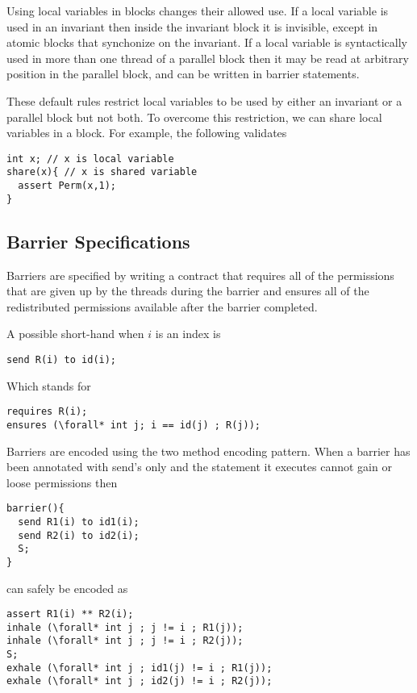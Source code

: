 Using local variables in blocks changes their allowed use.
If a local variable is used in an invariant then inside the invariant block it is invisible,
except in atomic blocks that synchonize on the invariant.
If a local variable is syntactically used in more than one thread of a
parallel block then it may be read at arbitrary position
in the parallel block, and can be written in barrier
statements.

These default rules restrict local variables to be used by either an invariant
or a parallel block but not both. To overcome this restriction, we can share local
variables in a block. For example, the following validates
\begin{lstlisting}
int x; // x is local variable
share(x){ // x is shared variable
  assert Perm(x,1);
}
\end{lstlisting}

\subsection{Barrier Specifications}

Barriers are specified by writing a contract that requires
all of the permissions that are given up by the threads
during the barrier and ensures all of the redistributed permissions
available after the barrier completed.

A possible short-hand when $i$ is an index is
\begin{lstlisting}
send R(i) to id(i);
\end{lstlisting}
Which stands for
\begin{lstlisting}
requires R(i);
ensures (\forall* int j; i == id(j) ; R(j));
\end{lstlisting}

Barriers are encoded using the two method encoding pattern.
When a barrier has been annotated with send's only
and the statement it executes cannot gain or loose permissions
then
\begin{lstlisting}
barrier(){
  send R1(i) to id1(i);
  send R2(i) to id2(i);
  S;
}
\end{lstlisting}
can safely be encoded as
\begin{lstlisting}
assert R1(i) ** R2(i);
inhale (\forall* int j ; j != i ; R1(j));
inhale (\forall* int j ; j != i ; R2(j));
S;
exhale (\forall* int j ; id1(j) != i ; R1(j));
exhale (\forall* int j ; id2(j) != i ; R2(j));
\end{lstlisting}

